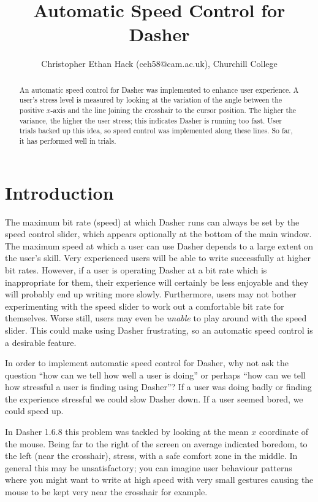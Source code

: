 \documentclass[a4paper,11pt,notitlepage]{article}
\author{\footnotesize{Christopher Ethan Hack (ceh58@cam.ac.uk), Churchill College}}
\title{\textbf{Automatic Speed Control for Dasher}}
\begin{document}
\maketitle

\begin{abstract}
An automatic speed control for Dasher was implemented to enhance user
experience. A user's stress level is measured by looking at the
variation of the angle between the positive $x$-axis and the line
joining the crosshair to the cursor position. The higher the variance,
the higher the user stress; this indicates Dasher is running too
fast. User trials backed up this idea, so speed control was
implemented along these lines. So far, it has performed well in
trials.
\end{abstract}

\section{Introduction}\label{sec:Intro}

The maximum bit rate (speed) at which Dasher runs can always be set by the
speed control slider, which appears optionally at the bottom of the main
window. The maximum speed at which a user can use Dasher depends to a large
extent on the user's skill. Very experienced users will be able to write
successfully at higher bit rates. However, if a user is operating Dasher at a
bit rate which is inappropriate for them, their experience will certainly be
less enjoyable and they will probably end up writing more slowly. Furthermore,
users may not bother experimenting with the speed slider to work out a
comfortable bit rate for themselves. Worse still, users may even be
\emph{unable} to play around with the speed slider. This could make using
Dasher frustrating, so an automatic speed control is a desirable feature.

In order to implement automatic speed control for Dasher, why not ask
the question ``how can we tell how well a user is doing'' or perhaps
``how can we tell how stressful a user is finding using Dasher''? If
a user was doing badly or finding the experience stressful we could
slow Dasher down. If a user seemed bored, we could speed up.

In Dasher 1.6.8 this problem was tackled by looking at the mean $x$
coordinate of the mouse. Being far to the right of the screen on
average indicated boredom, to the left (near the crosshair), stress,
with a safe comfort zone in the middle. In general this may be
unsatisfactory; you can imagine user behaviour patterns where you
might want to write at high speed with very small gestures causing
the mouse to be kept very near the crosshair for example.
\end{document}
